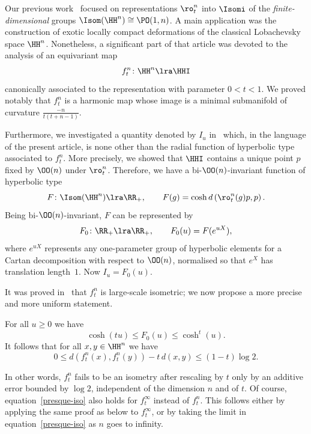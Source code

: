 Our previous work~\cite{Monod-Py} focused on representations $\ro^n_t$ into $\Isomi$ of the \emph{finite-dimensional} groups $\Isom(\HH^n) \cong \PO(1,n)$. A main application was the construction of exotic locally compact deformations of the classical Lobachevsky space $\HH^n$. Nonetheless, a significant part of that article was devoted to the ana\-lysis of an equivariant map
\begin{equation*}
f^n_t\colon \HH^n \lra \HHI
\end{equation*}
canonically associated to the representation with parameter $0<t<1$. We proved notably that $f^n_t$ is a harmonic map whose image is a minimal submanifold of curvature $\frac{-n}{t(t+n-1)}$.

Furthermore, we investigated a quantity denoted by $I_u$ in~\cite[\S3.C]{Monod-Py} which, in the language of the present article, is none other than the radial function of hyperbolic type associated to $f^n_t$. More precisely, we showed that $\HHI$ contains a unique point $p$ fixed by $\OO(n)$ under $\ro^n_t$. Therefore, we have a bi-$\OO(n)$-invariant function of hyperbolic type
\begin{equation*}
F\colon \Isom(\HH^n) \lra \RR_+, \qquad F(g) = \cosh d\left(\ro^n_t(g) p, p\right).
\end{equation*}
Being bi-$\OO(n)$-invariant, $F$ can be represented by
\begin{equation*}
F_0\colon \RR_+ \lra \RR_+, \qquad F_0(u) = F(e^{u X}),
\end{equation*}
where $e^{u X}$ represents any one-parameter group of hyperbolic elements for a Cartan decomposition with respect to $\OO(n)$, normalised so that $e^X$ has translation length~$1$. Now $I_u=F_0(u)$.

It was proved in~\cite{Monod-Py} that $f^n_t$ is large-scale isometric; we now propose a more precise and more uniform statement.

\begin{prop}\label{prop:metric}
For all $u\geq 0$ we have
\begin{equation*}
\cosh(t u) \leq F_0(u) \leq \cosh^t(u).
\end{equation*}
It follows that for all $x,y\in\HH^n$ we have
\begin{equation}\label{presque-iso}
0 \leq d\left(f^n_t(x), f^n_t(y)\right) - t\, d(x,y) \leq (1-t) \log 2.
\end{equation}
\end{prop}

In other words, $f^n_t$ fails to be an isometry after rescaling by $t$ only by an additive error bounded by $\log 2$, independent of the dimension $n$ and of $t$. Of course, equation~\eqref{presque-iso} also holds for $f^\infty_t$ instead of $f^{n}_t$. This follows either by applying the same proof as below to $f^\infty_t$, or by taking the limit in equation~\eqref{presque-iso} as $n$ goes to infinity.

